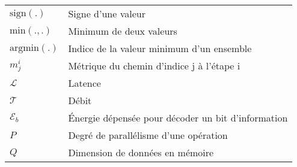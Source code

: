 \begin{center}
\begin{longtable}{ p{}  p{} }
$\text{sign}(.)$        & Signe d'une valeur                                      \\
$\text{min}(.,.)$       & Minimum de deux valeurs                                 \\
$\text{argmin}(.)$      & Indice de la valeur minimum d'un ensemble               \\
$m_j^i$                 & Métrique du chemin d'indice j à l'étape i               \\
$\mathcal{L}$           & Latence                                                 \\
$\mathcal{T}$           & Débit                                                   \\
$\mathcal{E}_b$         & \'Energie dépensée pour décoder un bit d'information    \\
$P$                     & Degré de parallélisme d'une opération                   \\
$Q$                     & Dimension de données en mémoire                         \\

\end{longtable}

\end{center}
